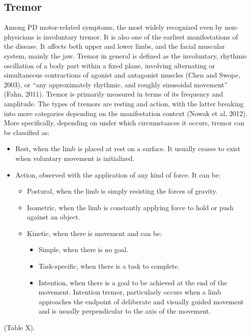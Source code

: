 \subsection{Tremor}
\label{subsec:tremor}
Among \gls{PD} motor-related symptoms, the most widely recognized even by non-physicians is involuntary tremor. It is also one of the earliest manifestations of the disease. It affects both upper and lower limbs, and the facial muscular system, mainly the jaw. Tremor in general is defined as the involuntary, rhythmic oscillation of a body part within a fixed plane, involving alternating or simultaneous contractions of agonist and antagonist muscles (Chen and Swope, 2003), or ``any approximately rhythmic, and roughly sinusoidal movement'' (Fahn, 2011). Tremor is primarily measured in terms of its frequency and amplitude. The types of tremors are resting and action, with the latter breaking into more categories depending on the manifestation context (Nowak et al, 2012). More specifically, depending on under which circumstances it occurs, tremor can be classified as:
\begin{itemize}
\item Rest, when the limb is placed at rest on a surface. It usually ceases to exist when voluntary movement is initialized.
\item Action, observed with the application of any kind of force. It can be:
\begin{itemize}
\item Postural, when the limb is simply resisting the forces of gravity.
\item Isometric, when the limb is constantly applying force to hold or push against an object.
\item Kinetic, when there is movement and can be:
\begin{itemize}
\item Simple, when there is no goal.
\item Task-specific, when there is a task to complete.
\item Intention, when there is a goal to be achieved at the end of the movement. Intention tremor, particularly occurs when a limb approaches the endpoint of deliberate and visually guided movement and is usually perpendicular to the axis of the movement.
\end{itemize}
\end{itemize}
\end{itemize}



(\textcolor{BurntOrange}{Table X}).

